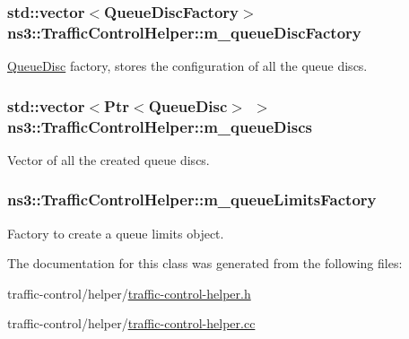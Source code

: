\subsubsection[{\texorpdfstring{m\+\_\+queue\+Disc\+Factory}{m_queueDiscFactory}}]{\setlength{\rightskip}{0pt plus 5cm}std\+::vector$<${\bf Queue\+Disc\+Factory}$>$ ns3\+::\+Traffic\+Control\+Helper\+::m\+\_\+queue\+Disc\+Factory\hspace{0.3cm}{\ttfamily [private]}}\hypertarget{classns3_1_1TrafficControlHelper_ae4ef4231b502104a4fd4245e53f9ae68}{}\label{classns3_1_1TrafficControlHelper_ae4ef4231b502104a4fd4245e53f9ae68}


\hyperlink{classns3_1_1QueueDisc}{Queue\+Disc} factory, stores the configuration of all the queue discs. 

\subsubsection[{\texorpdfstring{m\+\_\+queue\+Discs}{m_queueDiscs}}]{\setlength{\rightskip}{0pt plus 5cm}std\+::vector$<${\bf Ptr}$<${\bf Queue\+Disc}$>$ $>$ ns3\+::\+Traffic\+Control\+Helper\+::m\+\_\+queue\+Discs\hspace{0.3cm}{\ttfamily [private]}}\hypertarget{classns3_1_1TrafficControlHelper_a0eb99bd58e5d9858d7eb5b4453f886b1}{}\label{classns3_1_1TrafficControlHelper_a0eb99bd58e5d9858d7eb5b4453f886b1}


Vector of all the created queue discs. 

\subsubsection[{\texorpdfstring{m\+\_\+queue\+Limits\+Factory}{m_queueLimitsFactory}}]{ ns3\+::\+Traffic\+Control\+Helper\+::m\+\_\+queue\+Limits\+Factory\hspace{0.3cm}{\ttfamily [private]}}\hypertarget{classns3_1_1TrafficControlHelper_a7f9b244a4dc4e88326850501d56bffa4}{}\label{classns3_1_1TrafficControlHelper_a7f9b244a4dc4e88326850501d56bffa4}


Factory to create a queue limits object. 



The documentation for this class was generated from the following files\+:\begin{DoxyCompactItemize}
\item 
traffic-\/control/helper/\hyperlink{traffic-control-helper_8h}{traffic-\/control-\/helper.\+h}\item 
traffic-\/control/helper/\hyperlink{traffic-control-helper_8cc}{traffic-\/control-\/helper.\+cc}\end{DoxyCompactItemize}
